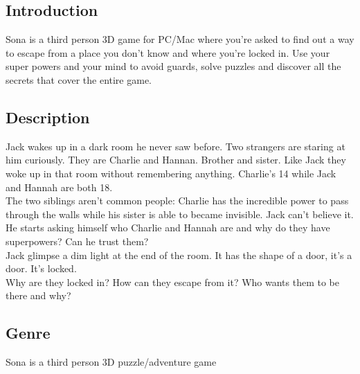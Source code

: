 \subsection{Introduction}
Sona is a third person 3D game for PC/Mac where you're asked to find out a way to escape from a place you don't know and where you're locked in. Use your super powers and your mind to avoid guards, solve puzzles and discover all the secrets that cover the entire game.

\subsection{Description}
Jack wakes up in a dark room he never saw before. Two strangers are staring at him curiously. They are Charlie and Hannan. Brother and sister. Like Jack they woke up in that room without remembering anything. Charlie’s 14 while Jack and Hannah are both 18. \\
The two siblings aren’t common people: Charlie has the incredible power to pass through the walls while his sister is able to became invisible. Jack can’t believe it. \\
He starts asking himself who Charlie and Hannah are and why do they have superpowers? Can he trust them? \\
Jack glimpse a dim light at the end of the room. It has the shape of a door, it’s a door. It’s locked. \\
Why are they locked in? How can they escape from it? Who wants them to be there and why?

\subsection{Genre}
Sona is a third person 3D puzzle/adventure game
